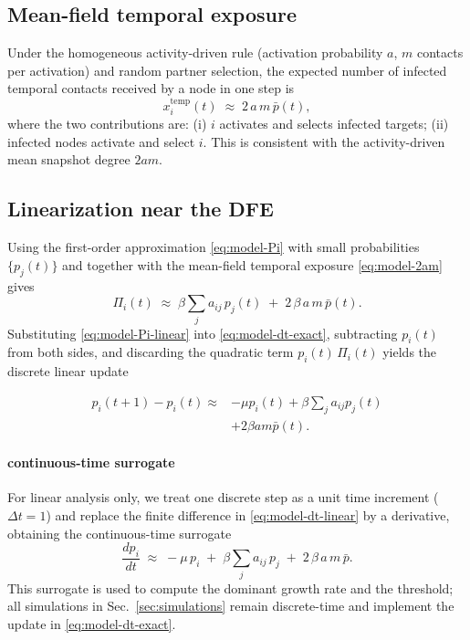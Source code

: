 \documentclass[pdflatex,sn-mathphys-num]{sn-jnl}%
\theoremstyle{thmstyleone}%
\theoremstyle{thmstyletwo}%
\theoremstyle{thmstylethree}%
\begin{document}
\subsection{Mean-field temporal exposure}
Under the homogeneous activity-driven rule (activation probability $a$, $m$ contacts per activation) and random partner selection, the expected number of infected temporal contacts received by a node in one step is
\begin{equation}
x_i^{\mathrm{temp}}(t)
\;\approx\; 2\,a\,m\,\bar p(t),
\label{eq:model-2am}
\end{equation}
where the two contributions are: (i) $i$ activates and selects infected targets; (ii) infected nodes activate and select $i$. This is consistent with the activity-driven mean snapshot degree $2am$\cite{Perra2012}.

\subsection{Linearization near the DFE}
Using the first-order approximation \eqref{eq:model-Pi} with small probabilities $\{p_j(t)\}$ and together with the mean-field temporal exposure \eqref{eq:model-2am} gives
\begin{equation}
\Pi_i(t)\;\approx\;\beta\sum_{j} a_{ij}\,p_j(t)\;+\;2\,\beta\,a\,m\,\bar p(t).
\label{eq:model-Pi-linear}
\end{equation}
Substituting \eqref{eq:model-Pi-linear} into \eqref{eq:model-dt-exact}, subtracting $p_i(t)$ from both sides, and discarding the quadratic term $p_i(t)\,\Pi_i(t)$ yields the discrete linear update

\begin{equation}
\begin{split}
p_i(t+1) - p_i(t) \approx & -\mu p_i(t) + \beta \sum_{j} a_{ij} p_j(t) \\
& + 2\beta a m \bar{p}(t).
\end{split}
\label{eq:model-dt-linear}
\end{equation}

\paragraph{continuous-time surrogate}
For linear analysis only, we treat one discrete step as a unit time increment
(\(\Delta t = 1\)) and replace the finite difference in \eqref{eq:model-dt-linear} by a
derivative, obtaining the continuous-time surrogate
\begin{equation}
\frac{dp_i}{dt}
\;\approx\;
-\mu\,p_i\;+\;\beta\sum_{j} a_{ij}\,p_j\;+\;2\,\beta\,a\,m\,\bar p.
\label{eq:model-ode}
\end{equation}
This surrogate is used to compute the dominant growth rate and the threshold; all
simulations in Sec.~\ref{sec:simulations} remain discrete-time and implement the update
in \eqref{eq:model-dt-exact}.
\end{document}
